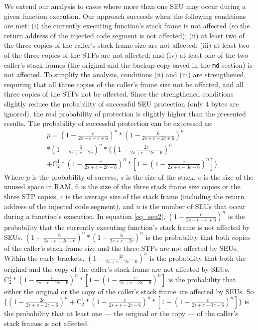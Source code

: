 We extend our analysis to cases where more than one SEU may occur during a given function execution. Our approach succeeds when the following conditions are met: (i) the currently executing function's stack frame is not affected (so the return address of the injected code segment is not affected); (ii) at least two of the three copies of the caller's stack frame size are not affected; (iii) at least two of the three copies of the STPs are not affected; and (iv) at least one of the two caller's stack frames (the original and the backup copy saved in the \texttt{md} section) is not affected. To simplify the analysis, conditions (ii) and (iii) are strengthened, requiring that all three copies of the caller's frame size not be affected, and all three copies of the STPs not be affected. Since the strengthened conditions slightly reduce the probability of successful SEU protection (only 4 bytes are ignored), the real probability of protection is slightly higher than the presented results. The probability of successful protection can be expressed as:
\begin{equation}\label{eq_seu2}
\begin{split}
&p=(1-\frac{c}{2s+e-c+6})^n*(1-\frac{6}{2s+e-2c+6})^n \\
&*(1-\frac{6}{2s+e-2c})^n*\{(1-\frac{2c}{2s+e-2c-6})^n \\
&+ \mathrm{C}_2^1*(1-\frac{c}{2s+e-2c-6})^n*[1-(1-\frac{c}{2s+e-3c-6})^n]\}
\end{split}
\end{equation}
Where $p$ is the probability of success, $s$ is the size of the stack, $e$ is the size of the unused space in RAM, $6$ is the size of the three stack frame size copies or the three STP copies, $c$ is the average size of the stack frame (including the return address of the injected code segment), and $n$ is the number of SEUs that occur during a function's execution. In equation \ref{eq_seu2}, $(1-\frac{c}{2s+e-c+6})^n$ is the probability that the currently executing function's stack frame is not affected by SEUs. $(1-\frac{6}{2s+e-2c+6})^n*(1-\frac{6}{2s+e-2c})^n$ is the probability that both copies of the caller's stack frame size and the three STPs are not affected by SEUs. Within the curly brackets, $(1-\frac{2c}{2s+e-2c-6})^n$ is the probability that both the original and the copy of the caller's stack frame are not affected by SEUs. $\mathrm{C}_2^1*(1-\frac{c}{2s+e-2c-6})^n*[1-(1-\frac{c}{2s+e-3c-6})^n]$ is the probability that either the original or the copy of the caller's stack frame are affected by SEUs. So $\{(1-\frac{2c}{2s+e-2c-6})^n + \mathrm{C}_2^1*(1-\frac{c}{2s+e-2c-6})^n*[1-(1-\frac{c}{2s+e-3c-6})^n]\}$ is the probability that at least one --- the original or the copy --- of the caller's stack frames is not affected.

